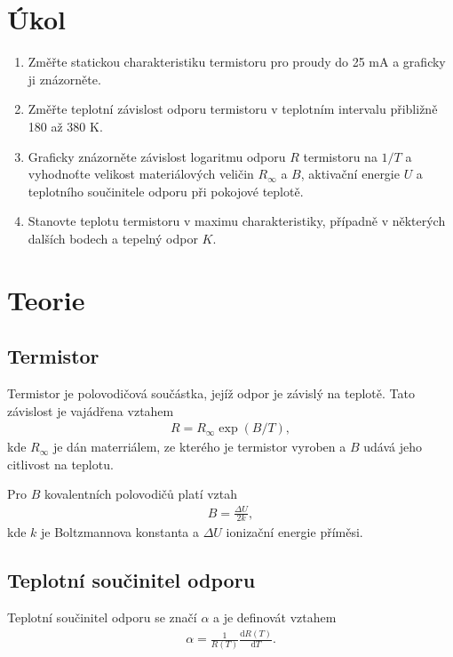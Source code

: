 \documentclass[a4paper,12pt]{article}
\begin{document}
\section{Úkol}
\noindent
\begin{enumerate}
    \item   Změřte statickou charakteristiku termistoru pro proudy do 25 mA a graficky ji znázorněte.
    \item   Změřte teplotní závislost odporu termistoru v teplotním intervalu přibližně 180 až 380 K.
    \item   Graficky znázorněte závislost logaritmu odporu $R$ termistoru na $1/T$ a vyhodnoťte velikost 
    materiálových veličin $R_\infty$ a $B$, aktivační energie $U$ a teplotního součinitele odporu při pokojové teplotě.
    \item   Stanovte teplotu termistoru v maximu charakteristiky, případně v některých dalších bodech a tepelný odpor $K$. 
\end{enumerate}

\section{Teorie}

\subsection{Termistor}
Termistor je polovodičová součástka, jejíž odpor je závislý na teplotě. Tato závislost je vajádřena vztahem
\begin{eqnarray}
    R=R_\infty \exp(B/T),
    \label{R}
\end{eqnarray}
kde $R_\infty$ je dán materriálem, ze kterého je termistor vyroben a $B$ udává jeho citlivost na teplotu.

Pro $B$ kovalentních polovodičů platí vztah
\begin{eqnarray}
    B=\frac{\Delta U}{2k},
    \label{B}
\end{eqnarray}
kde $k$ je Boltzmannova konstanta a $\Delta U$ ionizační energie příměsi.

\subsection{Teplotní součinitel odporu}
Teplotní součinitel odporu se značí $\alpha$ a je definovát vztahem
\begin{eqnarray}
    \alpha=\frac{1}{R(T)}\frac{\mbox{d}R(T)}{\mbox{d}T}.
\end{eqnarray}
\end{document}
